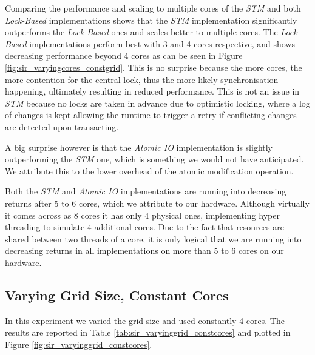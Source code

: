 Comparing the performance and scaling to multiple cores of the \textit{STM} and both \textit{Lock-Based} implementations shows that the \textit{STM} implementation significantly outperforms the \textit{Lock-Based} ones and scales better to multiple cores. The \textit{Lock-Based} implementations perform best with 3 and 4 cores respective, and shows decreasing performance beyond 4 cores as can be seen in Figure \ref{fig:sir_varyingcores_constgrid}. This is no surprise because the more cores, the more contention for the central lock, thus the more likely synchronisation happening, ultimately resulting in reduced performance. This is not an issue in \textit{STM} because no locks are taken in advance due to optimistic locking, where a log of changes is kept allowing the runtime to trigger a retry if conflicting changes are detected upon transacting. 

A big surprise however is that the \textit{Atomic IO} implementation is slightly outperforming the \textit{STM} one, which is something we would not have anticipated. We attribute this to the lower overhead of the atomic modification operation.

Both the \textit{STM} and \textit{Atomic IO} implementations are running into decreasing returns after 5 to 6 cores, which we attribute to our hardware. Although virtually it comes across as 8 cores it has only 4 physical ones, implementing hyper threading to simulate 4 additional cores. Due to the fact that resources are shared between two threads of a core, it is only logical that we are running into decreasing returns in all implementations on more than 5 to 6 cores on our hardware.

\subsection{Varying Grid Size, Constant Cores}
In this experiment we varied the grid size and used constantly 4 cores. The results are reported in Table \ref{tab:sir_varyinggrid_constcores} and plotted in Figure \ref{fig:sir_varyinggrid_constcores}.

